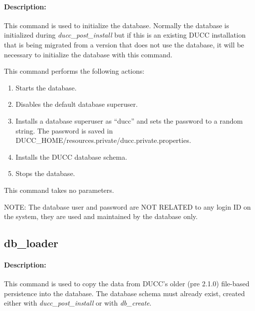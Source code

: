     \paragraph{Description:}
        This command is used to initialize the database.  Normally the database is initialized
        during {\em ducc\_post\_install} but if this is an existing DUCC installation that is 
        being migrated from a version that does not use the database, it will be necessary to
        initialize the database with this command.

        This command performs the following actions:
        \begin{enumerate}
          \item Starts the database.
          \item Disables the default database superuser.
          \item Installs a database superuser as ``ducc'' and sets the password
            to a random string.  The password is saved
            in DUCC\_HOME/resources.private/ducc.private.properties.
          \item Installs the DUCC database schema.
          \item Stops the database.
        \end{enumerate}
        

         This command takes no parameters.

         NOTE: The database user and password are NOT RELATED to any login ID on the system,
         they are used and maintained by the database only.

\subsection{db\_loader}
\label{subsec:admin.db-loader}

    \paragraph{Description:}
        This command is used to copy the data from DUCC's older (pre 2.1.0) file-based persistence
        into the database.  The database schema must already exist, created either
        with {\em ducc\_post\_install} or with {\em db\_create}.

